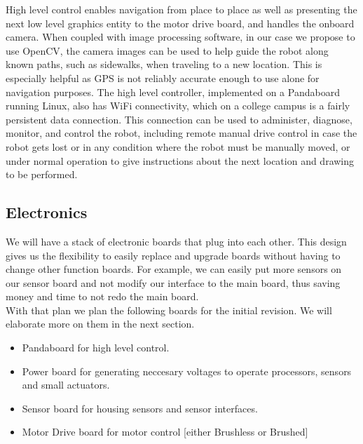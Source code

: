 \documentclass{article}
\begin{document}
High level control enables navigation from place to place as well as presenting the next low level graphics entity to the motor drive board, and handles the onboard camera. When coupled with image processing software, in our case we propose to use OpenCV, the camera images can be used to help guide the robot along known paths, such as sidewalks, when traveling to a new location. This is especially helpful as GPS is not reliably accurate enough to use alone for navigation purposes. The high level controller, implemented on a Pandaboard running Linux, also has WiFi connectivity, which on a college campus is a fairly persistent data connection. This connection can be used to administer, diagnose, monitor, and control the robot, including remote manual drive control in case the robot gets lost or in any condition where the robot must be manually moved, or under normal operation to give instructions about the next location and drawing to be performed.\\
\subsection{Electronics}
We will have a stack of electronic boards that plug into each other. This design gives us the flexibility to easily replace and upgrade boards  without having to change other function boards. For example, we can easily put more sensors on our sensor board and not modify our interface to the main board, thus saving money and time to not redo the main board.\\
With that plan we plan the following boards for the initial revision. We will elaborate more on them in the next section.
\begin{itemize}
\item Pandaboard for high level control.
\item Power board for generating neccesary voltages to operate processors, sensors and small actuators.
\item Sensor board for housing sensors and sensor interfaces.
\item Motor Drive board for motor control [either Brushless or Brushed]
\end{itemize}
\end{document}

